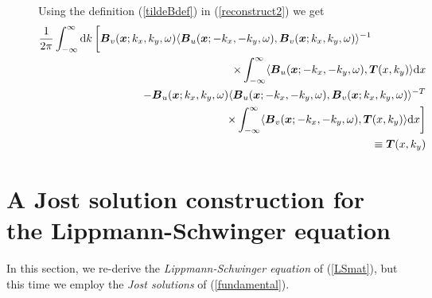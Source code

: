 \begin{figure}
{\begin{minipage} {142.0mm}
Using the definition (\ref{tildeBdef}) in (\ref{reconstruct2}) we get
\begin{eqnarray} \label{reconstruct3}
\lefteqn{
\frac{1}{2 \pi}\int_{-\infty}^{\infty} {\rm d}k\, \bigg[
{\bmi  B}_{ v}({\bmi x};k_x,k_y,\omega) \langle{ 
{\bmi  B}_{u}({\bmi x};-k_x,-k_y,\omega),  {\bmi  B}_{v}({\bmi x};k_x,k_y,\omega)
}\rangle^{-1}    }\nonumber\\
&&\qquad\qquad\qquad\qquad\qquad\qquad\qquad\qquad\times \int_{-\infty}^{\infty} \langle{ 
{\bmi  B}_{u}({\bmi x};-k_x,-k_y,\omega),  {\bmi  T}(x,k_y)
}\rangle {\rm d}x\nonumber\\
&&
-{\bmi  B}_{ u}({\bmi x};k_x,k_y,\omega) \langle{ 
{\bmi  B}_{u}({\bmi x};-k_x,-k_y,\omega),  {\bmi  B}_{v}({\bmi x};k_x,k_y,\omega)
}\rangle^{-T}\nonumber\\
&& \qquad\qquad\qquad\qquad\qquad\qquad\qquad\qquad\times
 \int_{-\infty}^{\infty} \langle{ 
{\bmi  B}_{v}({\bmi x};-k_x,-k_y,\omega),  {\bmi  T}(x,k_y)
}\rangle {\rm d}x
\bigg]\nonumber\\
&&\equiv {\bmi  T}(x,k_y)
\end{eqnarray}

\vspace{6mm}
\end{minipage}
}
\end{figure}



\newpage
\section{A Jost solution construction for the Lippmann-Schwinger equation} 
\label{sectionstratG}
In this section, we  re-derive the {\em  Lippmann-Schwinger equation\/} of 
(\ref{LSmat}), but this time we employ the {\em Jost solutions\/} of (\ref{fundamental}).

